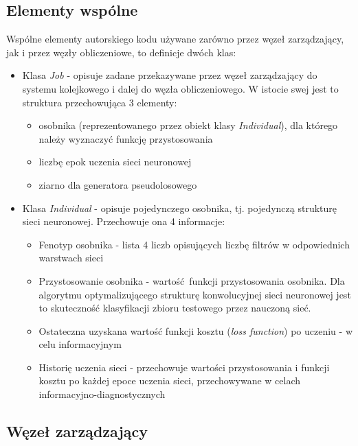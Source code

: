 \subsection{Elementy wspólne}
Wspólne elementy autorskiego kodu używane zarówno przez węzeł zarządzający, jak i przez węzły obliczeniowe, to definicje dwóch klas:
\begin{itemize}
  \item Klasa \textit{Job} - opisuje zadane przekazywane przez węzeł zarządzający do systemu kolejkowego i dalej do węzła obliczeniowego.
        W istocie swej jest to struktura przechowująca 3 elementy:
        \begin{itemize}
          \item osobnika (reprezentowanego przez obiekt klasy \textit{Individual}), dla którego należy wyznaczyć funkcję przystosowania
          \item liczbę epok uczenia sieci neuronowej
          \item ziarno dla generatora pseudolosowego
        \end{itemize}
  \item Klasa \textit{Individual} - opisuje pojedynczego osobnika, tj. pojedynczą strukturę sieci neuronowej.
        Przechowuje ona 4 informacje:
        \begin{itemize}
          \item Fenotyp osobnika - lista 4 liczb opisujących liczbę filtrów w odpowiednich warstwach sieci
          \item Przystosowanie osobnika - wartość funkcji przystosowania osobnika.
                Dla algorytmu optymalizującego strukturę konwolucyjnej sieci neuronowej jest to skuteczność klasyfikacji zbioru testowego przez nauczoną sieć.
          \item Ostateczna uzyskana wartość funkcji kosztu (\textit{loss function}) po uczeniu - w celu informacyjnym
          \item Historię uczenia sieci - przechowuje wartości przystosowania i funkcji kosztu po każdej epoce uczenia sieci, przechowywane w celach informacyjno-diagnostycznych
        \end{itemize}
\end{itemize}


\subsection{Węzeł zarządzający}

